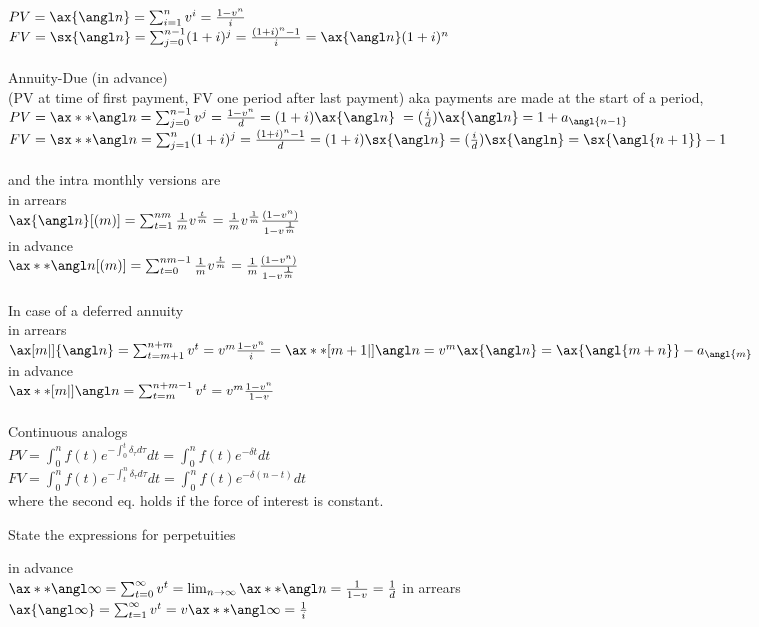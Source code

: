 \documentclass[11pt,a4paper,twoside]{article}
\begin{document}
$ PV = \ax{\angl n} = \sum_{i=1}^n v^i = \frac{1 - v^n}{i} $ \\
$ FV = \sx{\angl n} = \sum_{j=0}^{n-1} (1 + i)^j = \frac{(1 + i)^n - 1}{i} = \ax{\angl n}(1 + i)^n$ \\
\\
Annuity-Due (in advance) \\
(PV at time of first payment, FV one period after last payment) aka payments are made at the start of a period,\\
$PV = \ax**{\angl n} = \sum_{j=0}^{n-1} v^j = \frac{1-v^n}{d} = (1 + i)\ax{\angl n}$
$ = (\frac{i}{d})\ax{\angl n} = 1 + a_{\angl{n -1}}$ \\
$ FV = \sx**{\angl n} = \sum_{j=1}^{n} (1 + i)^j = \frac{(1 + i)^n - 1}{d} = (1+i)\sx{\angl n} = (\frac{i}{d})\sx{\angln} = \sx{\angl{n+1}} - 1 $ \\
\\
and the intra monthly versions are \\
in arrears \\
$\ax{\angl n}[(m)] = \sum^{nm}_{t = 1} \frac{1}{m}v^{\frac{t}{m}} = \frac{1}{m}v^{\frac{1}{m}}\frac{(1 - v^n)}{1 - v^{\frac{1}{m}}}$ \\
in advance \\
$ \ax**{\angl n}[(m)] = \sum^{nm-1}_{t = 0} \frac{1}{m}v^{\frac{t}{m}} = \frac{1}{m}\frac{(1 - v^n)}{1 - v^{\frac{1}{m}}}$ \\
\\
In case of a deferred annuity \\
in arrears \\
$\ax[m|]{\angl n} = \sum_{t=m+1}^{n + m} v^t = v^m \frac{1 - v^n}{i} = \ax**[m+1|]{\angl n} = v^m \ax{\angl n} = \ax{\angl{m+n}} - a_{\angl{m}}$ \\
in advance \\
$ \ax**[m|]{\angl n} = \sum_{t=m}^{n + m -1} v^t = v^m\frac{1 - v^n}{1 - v}$ \\
\\
Continuous analogs \\
$ PV = \int_0^n f(t)e^{-\int_{0}^{t} \delta_\tau d\tau} dt = \int_{0}^n f(t)e^{-\delta t} dt $  \\
$ FV = \int_0^n f(t)e^{-\int_{t}^{n} \delta_\tau d\tau} dt = \int_{0}^n f(t)e^{-\delta (n-t)} dt $ \\
where the second eq. holds if the force of interest is constant.



State the expressions for perpetuities

in advance\\
$ \ax**{\angl \infty} = \sum_{t=0}^\infty v^t = \lim_{n \to \infty} \ax**{\angl n} = \frac{1}{1 - v} = \frac{1}{d}$
in arrears\\
$ \ax{\angl \infty} = \sum_{t=1}^\infty v^t = v\ax**{\angl \infty} = \frac{1}{i}$
\end{document}
